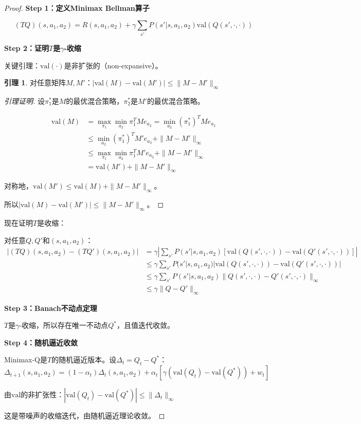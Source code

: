 \documentclass[11pt,a4paper]{article}
\theoremstyle{definition}
\newtheorem{lemma}{引理}[section]
\begin{document}
\begin{proof}
\textbf{Step 1：定义Minimax Bellman算子}

\[
(T Q)(s, a_1, a_2) = R(s, a_1, a_2) + \gamma \sum_{s'} P(s'|s, a_1, a_2) \text{val}(Q(s', \cdot, \cdot))
\]

\textbf{Step 2：证明$T$是$\gamma$-收缩}

关键引理：$\text{val}(\cdot)$是非扩张的（non-expansive）。

\begin{lemma}
对任意矩阵$M, M'$：$|\text{val}(M) - \text{val}(M')| \leq \|M - M'\|_\infty$
\end{lemma}

\begin{proof}[引理证明]
设$\pi_1^*$是$M$的最优混合策略，$\pi_2^*$是$M'$的最优混合策略。

\begin{align*}
\text{val}(M) &= \max_{\pi_1} \min_{a_2} \pi_1^T M e_{a_2} = \min_{a_2} (\pi_1^*)^T M e_{a_2} \\
&\leq \min_{a_2} (\pi_1^*)^T M' e_{a_2} + \|M - M'\|_\infty \\
&\leq \max_{\pi_1} \min_{a_2} \pi_1^T M' e_{a_2} + \|M - M'\|_\infty \\
&= \text{val}(M') + \|M - M'\|_\infty
\end{align*}

对称地，$\text{val}(M') \leq \text{val}(M) + \|M - M'\|_\infty$。

所以$|\text{val}(M) - \text{val}(M')| \leq \|M - M'\|_\infty$。
\end{proof}

现在证明$T$是收缩：

对任意$Q, Q'$和$(s, a_1, a_2)$：
\begin{align*}
|(TQ)(s,a_1,a_2) - (TQ')(s,a_1,a_2)| &= \gamma \left|\sum_{s'} P(s'|s,a_1,a_2)[\text{val}(Q(s',\cdot,\cdot)) - \text{val}(Q'(s',\cdot,\cdot))]\right| \\
&\leq \gamma \sum_{s'} P(s'|s,a_1,a_2) |\text{val}(Q(s',\cdot,\cdot)) - \text{val}(Q'(s',\cdot,\cdot))| \\
&\leq \gamma \sum_{s'} P(s'|s,a_1,a_2) \|Q(s',\cdot,\cdot) - Q'(s',\cdot,\cdot)\|_\infty \\
&\leq \gamma \|Q - Q'\|_\infty
\end{align*}

\textbf{Step 3：Banach不动点定理}

$T$是$\gamma$-收缩，所以存在唯一不动点$Q^*$，且值迭代收敛。

\textbf{Step 4：随机逼近收敛}

Minimax-Q是$T$的随机逼近版本。设$\Delta_t = Q_t - Q^*$：
\[
\Delta_{t+1}(s,a_1,a_2) = (1-\alpha_t)\Delta_t(s,a_1,a_2) + \alpha_t[\gamma(\text{val}(Q_t) - \text{val}(Q^*)) + w_t]
\]

由$\text{val}$的非扩张性：$|\text{val}(Q_t) - \text{val}(Q^*)| \leq \|\Delta_t\|_\infty$

这是带噪声的收缩迭代，由随机逼近理论收敛。
\end{proof}
\end{document}
